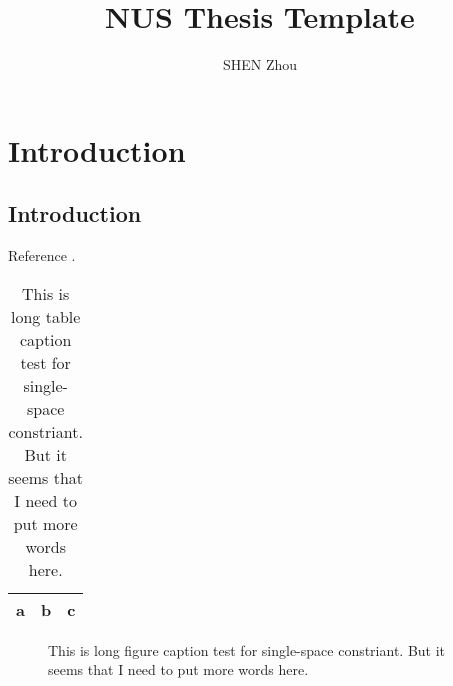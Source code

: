 \documentclass[a4paper, 12pt, twoside]{NUSThesis}
\title{NUS Thesis Template}
\author{SHEN Zhou}
\begin{document}
\maketitle
\makedeclaration
\frontmatter
\begin{acknowledgments}
\lipsum[1-2]
\end{acknowledgments}
\tableofcontents
\cleardoublepage
\begin{abstract}
\lipsum[1-3]
\end{abstract}
\listoftables
\listoffigures
\mainmatter
\chapter{Introduction}
\section{Introduction}
\lipsum[1-4]

Reference \cite{ayyer_dragonfly_2016}.
\begin{table}[htpb]
    \centering
    \caption[short table caption]{This is long table caption test for single-space constriant. But
    it seems that I need to put more words here.}
    \begin{tabular}{ccc}
        \hline
        a & b & c\\
        \hline
    \end{tabular}
\end{table}
\lipsum[1-4]
\begin{figure}
    \centering
    \caption[short figure caption]{This is long figure caption test for single-space constriant. But
    it seems that I need to put more words here.}
\end{figure}

\printbibliography[heading=bibintoc]
\end{document}
